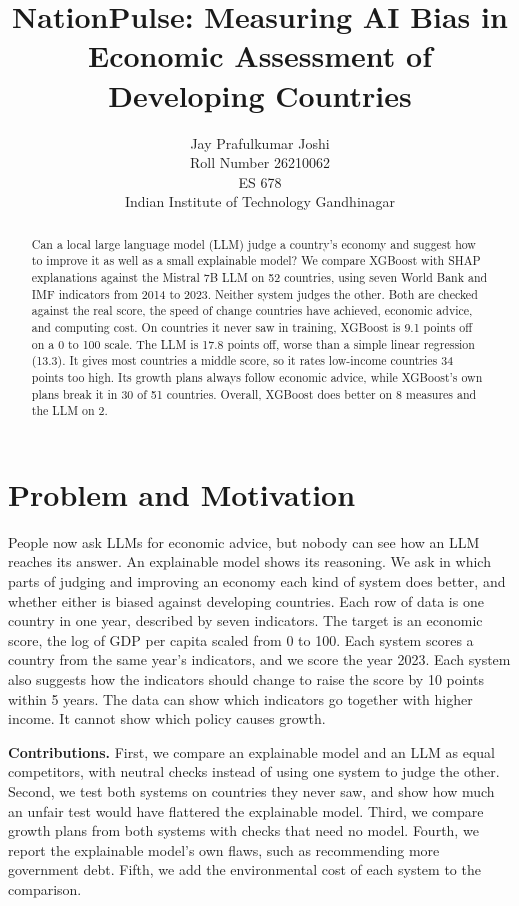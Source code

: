 \documentclass{article}
\title{NationPulse: Measuring AI Bias in Economic Assessment of Developing Countries}
\author{%
  Jay Prafulkumar Joshi \\
  Roll Number 26210062 \\
  ES 678 \\
  Indian Institute of Technology Gandhinagar
}
\begin{document}
\maketitle

\begin{abstract}
Can a local large language model (LLM) judge a country's economy and suggest how to improve it as well as a small explainable model? We compare XGBoost with SHAP explanations against the Mistral 7B LLM on 52 countries, using seven World Bank and IMF indicators from 2014 to 2023. Neither system judges the other. Both are checked against the real score, the speed of change countries have achieved, economic advice, and computing cost. On countries it never saw in training, XGBoost is 9.1 points off on a 0 to 100 scale. The LLM is 17.8 points off, worse than a simple linear regression (13.3). It gives most countries a middle score, so it rates low-income countries 34 points too high. Its growth plans always follow economic advice, while XGBoost's own plans break it in 30 of 51 countries. Overall, XGBoost does better on 8 measures and the LLM on 2.
\end{abstract}

\section{Problem and Motivation}
People now ask LLMs for economic advice, but nobody can see how an LLM reaches its answer. An explainable model shows its reasoning. We ask in which parts of judging and improving an economy each kind of system does better, and whether either is biased against developing countries. Each row of data is one country in one year, described by seven indicators. The target is an economic score, the log of GDP per capita scaled from 0 to 100. Each system scores a country from the same year's indicators, and we score the year 2023. Each system also suggests how the indicators should change to raise the score by 10 points within 5 years. The data can show which indicators go together with higher income. It cannot show which policy causes growth.

\textbf{Contributions.} First, we compare an explainable model and an LLM as equal competitors, with neutral checks instead of using one system to judge the other. Second, we test both systems on countries they never saw, and show how much an unfair test would have flattered the explainable model. Third, we compare growth plans from both systems with checks that need no model. Fourth, we report the explainable model's own flaws, such as recommending more government debt. Fifth, we add the environmental cost of each system to the comparison.
\end{document}
